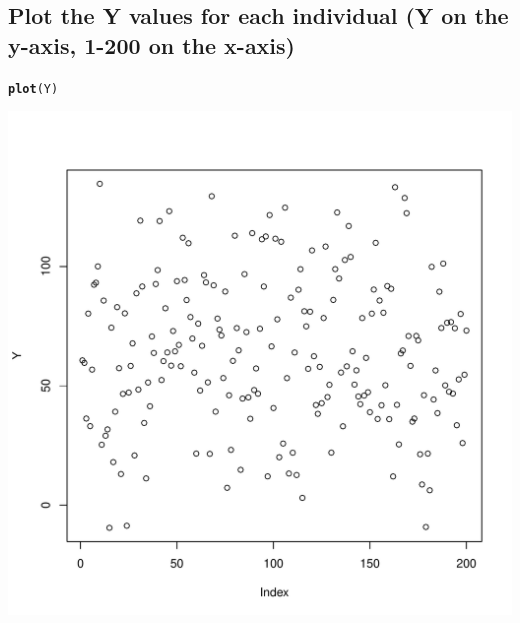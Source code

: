 \documentclass{article}\usepackage[]{graphicx}\usepackage[]{color}
\makeatletter
\def\maxwidth{ %
  \ifdim\Gin@nat@width>\linewidth
    \linewidth
  \else
    \Gin@nat@width
  \fi
}
\newcommand{\hlstd}[1]{\textcolor[rgb]{0.345,0.345,0.345}{#1}}%
\newcommand{\hlkwd}[1]{\textcolor[rgb]{0.737,0.353,0.396}{\textbf{#1}}}%
\newenvironment{kframe}{%
 \def\at@end@of@kframe{}%
 \ifinner\ifhmode%
  \def\at@end@of@kframe{\end{minipage}}%
  \begin{minipage}{\columnwidth}%
 \fi\fi%
 \def\FrameCommand##1{\hskip\@totalleftmargin \hskip-\fboxsep
 \colorbox{shadecolor}{##1}\hskip-\fboxsep
     \hskip-\linewidth \hskip-\@totalleftmargin \hskip\columnwidth}%
 \MakeFramed {\advance\hsize-\width
   \@totalleftmargin\z@ \linewidth\hsize
   \@setminipage}}%
 {\par\unskip\endMakeFramed%
 \at@end@of@kframe}
\newenvironment{knitrout}{}{} %
\makeatother
\begin{document}
\subsection{Plot the Y values for each individual (Y on the y-axis, 1-200 on the x-axis)}
\begin{knitrout}
\color{fgcolor}\begin{kframe}
\begin{alltt}
\hlkwd{plot}\hlstd{(Y)}
\end{alltt}
\end{kframe}
\includegraphics[width=\maxwidth]{figure/unnamed-chunk-12-1} 

\end{knitrout}
\end{document}
